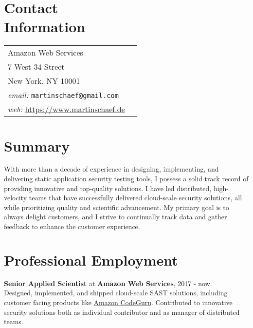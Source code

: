 \documentclass[margin,line]{res}
\begin{document}

\begin{resume}
\section{\sc Contact\\ Information}

\begin{tabular}{@{}p{3in}p{4in}}
Amazon Web Services  & \\%
7 West 34 Street &\\
New York, NY 10001 & \\
\emph{email:}  \texttt{martinschaef@gmail.com} & \\
\emph{web:} \url{https://www.martinschaef.de} & \\
\end{tabular}



%

\section{\sc Summary}
With more than a decade of experience in designing, implementing, and delivering static application security testing tools, 
I possess a solid track record of providing innovative and top-quality solutions. I have led distributed, high-velocity 
teams that have successfully delivered cloud-scale security solutions, all while prioritizing quality and scientific advancement. 
My primary goal is to always delight customers, and I strive to continually track data and gather feedback to enhance the customer experience.

\section{\sc Professional Employment}

\textbf{Senior Applied Scientist} at \textbf{Amazon Web Services}, 2017 - now.\\
Designed, implemented, and shipped cloud-scale SAST solutions, including customer facing products
like \href{https://aws.amazon.com/codeguru/}{Amazon CodeGuru}. Contributed to innovative security solutions both as individual contributor
and as manager of distributed teams.
 


\end{resume}
\end{document}

